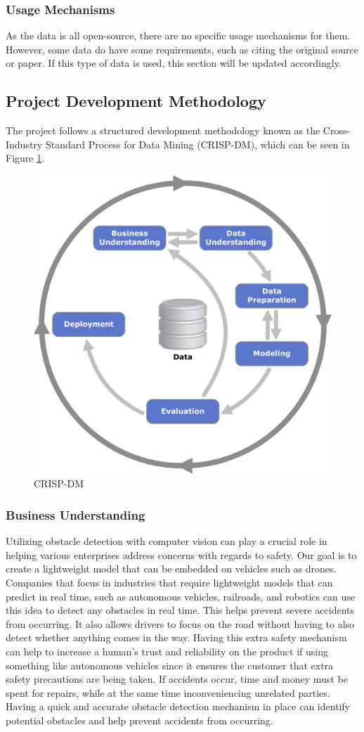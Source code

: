\documentclass[stu,12pt,floatsintext]{apa7}
\begin{document}
\subsubsection{Usage Mechanisms}
As the data is all open-source, there are no specific usage mechanisms for them. However, some data do have some requirements, such as citing the original source or paper. If this type of data is used, this section will be updated accordingly.


\subsection{Project Development Methodology}
The project follows a structured development methodology known as the Cross-Industry Standard Process for Data Mining (CRISP-DM), which can be seen in Figure \ref{fig:crispdm}.

\begin{figure}[!htb]
	\centering
	\includegraphics[width=0.5\linewidth]{./images/CRISP-DM.png}
	\caption{CRISP-DM}
	\label{fig:crispdm}
\end{figure}

\subsubsection{Business Understanding}
Utilizing obstacle detection with computer vision can play a crucial role in helping various enterprises address concerns with regards to safety. Our goal is to create a lightweight model that can be embedded on vehicles such as drones. Companies that focus in industries that require lightweight models that can predict in real time, such as autonomous vehicles, railroads, and robotics can use this idea to detect any obstacles in real time. This helps prevent severe accidents from occurring. It also allows drivers to focus on the road without having to also detect whether anything comes in the way. Having this extra safety mechanism can help to increase a human's trust and reliability on the product if using something like autonomous vehicles since it ensures the customer that extra safety precautions are being taken. If accidents occur, time and money must be spent for repairs, while at the same time inconveniencing unrelated parties. Having a quick and accurate obstacle detection mechanism in place can identify potential obstacles and help prevent accidents from occurring.
\end{document}
